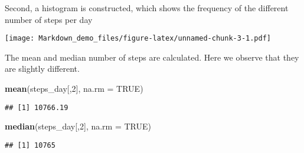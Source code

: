\documentclass[]{article}
\newenvironment{Shaded}{\begin{snugshade}}{\end{snugshade}}
\newcommand{\KeywordTok}[1]{\textcolor[rgb]{0.13,0.29,0.53}{\textbf{#1}}}
\newcommand{\DataTypeTok}[1]{\textcolor[rgb]{0.13,0.29,0.53}{#1}}
\newcommand{\DecValTok}[1]{\textcolor[rgb]{0.00,0.00,0.81}{#1}}
\newcommand{\StringTok}[1]{\textcolor[rgb]{0.31,0.60,0.02}{#1}}
\newcommand{\OtherTok}[1]{\textcolor[rgb]{0.56,0.35,0.01}{#1}}
\newcommand{\OperatorTok}[1]{\textcolor[rgb]{0.81,0.36,0.00}{\textbf{#1}}}
\newcommand{\NormalTok}[1]{#1}
\begin{document}
\begin{Shaded}
\end{Shaded}

Second, a histogram is constructed, which shows the frequency of the
different number of steps per day

\begin{Shaded}
\end{Shaded}

\texttt{[image: Markdown\_demo\_files/figure-latex/unnamed-chunk-3-1.pdf]}

The mean and median number of steps are calculated. Here we observe that
they are slightly different.

\begin{Shaded}
\begin{Highlighting}[]
\KeywordTok{mean}\NormalTok{(steps_day[,}\DecValTok{2}\NormalTok{], }\DataTypeTok{na.rm =} \OtherTok{TRUE}\NormalTok{)}
\end{Highlighting}
\end{Shaded}

\begin{verbatim}
## [1] 10766.19
\end{verbatim}

\begin{Shaded}
\begin{Highlighting}[]
\KeywordTok{median}\NormalTok{(steps_day[,}\DecValTok{2}\NormalTok{], }\DataTypeTok{na.rm =} \OtherTok{TRUE}\NormalTok{)}
\end{Highlighting}
\end{Shaded}

\begin{verbatim}
## [1] 10765
\end{verbatim}
\end{document}

